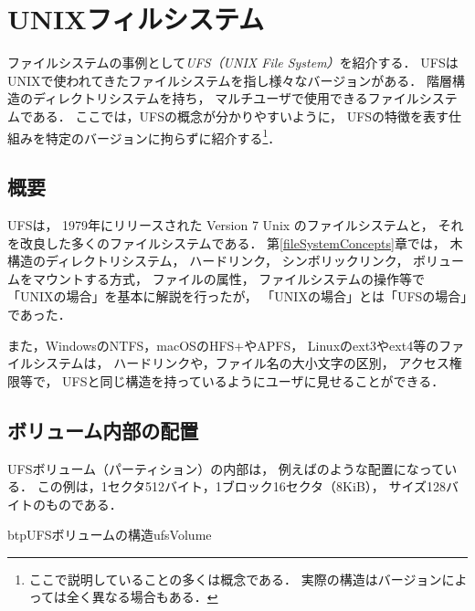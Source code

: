 \chapter{UNIXフィルシステム}
ファイルシステムの事例として\emph{UFS（UNIX File System）}を紹介する．
UFSはUNIXで使われてきたファイルシステムを指し様々なバージョンがある．
階層構造のディレクトリシステムを持ち，
マルチユーザで使用できるファイルシステムである．
ここでは，UFSの概念が分かりやすいように，
UFSの特徴を表す仕組みを特定のバージョンに拘らずに紹介する\footnote{
ここで説明していることの多くは概念である．
実際の構造はバージョンによっては全く異なる場合もある．}．

\section{概要}
UFSは，
1979年にリリースされた Version 7 Unix のファイルシステムと，
それを改良した多くのファイルシステムである．
第\ref{fileSystemConcepts}章では，
木構造のディレクトリシステム，
ハードリンク，
シンボリックリンク，
ボリュームをマウントする方式，
ファイルの属性，
ファイルシステムの操作等で「UNIXの場合」を基本に解説を行ったが，
「UNIXの場合」とは「UFSの場合」であった．

また，WindowsのNTFS，macOSのHFS+やAPFS，
Linuxのext3やext4等のファイルシステムは，
ハードリンクや，ファイル名の大小文字の区別，
アクセス権限等で，
UFSと同じ構造を持っているようにユーザに見せることができる．

\section{ボリューム内部の配置}
\label{ufsVolumeLayout}
UFSボリューム（パーティション）の内部は，
例えばのような配置になっている．
この例は，1セクタ512バイト，1ブロック16セクタ（8KiB），
\inode サイズ128バイトのものである．

\begin{myfig}{btp}{UFSボリュームの構造}{ufsVolume}
\end{myfig}

